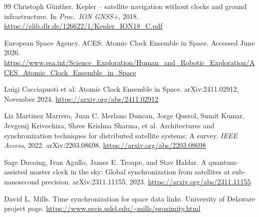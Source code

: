 \documentclass[twocolumn,10pt]{article}
\begin{document}
\begin{thebibliography}{99}
Christoph G\"unther.
Kepler -- satellite navigation without clocks and ground infrastructure.
In \textit{Proc.\ ION GNSS+}, 2018.
\url{https://elib.dlr.de/126622/1/Kepler_ION18_C.pdf}

European Space Agency.
ACES: Atomic Clock Ensemble in Space.
Accessed June 2026.
\url{https://www.esa.int/Science_Exploration/Human_and_Robotic_Exploration/ACES_Atomic_Clock_Ensemble_in_Space}

Luigi Cacciapuoti et al.
Atomic Clock Ensemble in Space.
arXiv:2411.02912, November 2024.
\url{https://arxiv.org/abs/2411.02912}

Liz Martinez Marrero, Juan C. Merlano Duncan, Jorge Querol, Sumit Kumar, Jevgenij Krivochiza, Shree Krishna Sharma, et al.
Architectures and synchronization techniques for distributed satellite systems: A survey.
\textit{IEEE Access}, 2022. arXiv:2203.08698.
\url{https://arxiv.org/abs/2203.08698}

Sage Ducoing, Ivan Agullo, James E. Troupe, and Stav Haldar.
A quantum-assisted master clock in the sky: Global synchronization from satellites at sub-nanosecond precision.
arXiv:2311.11155, 2023.
\url{https://arxiv.org/abs/2311.11155}

David L. Mills.
Time synchronization for space data links.
University of Delaware project page.
\url{https://www.eecis.udel.edu/~mills/proximity.html}

\end{thebibliography}
\end{document}
